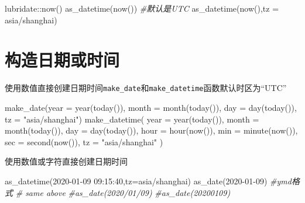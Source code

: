 \documentclass[
]{book}
\newenvironment{Shaded}{\begin{snugshade}}{\end{snugshade}}
\newcommand{\AttributeTok}[1]{\textcolor[rgb]{0.77,0.63,0.00}{#1}}
\newcommand{\CommentTok}[1]{\textcolor[rgb]{0.56,0.35,0.01}{\textit{#1}}}
\newcommand{\FunctionTok}[1]{\textcolor[rgb]{0.00,0.00,0.00}{#1}}
\newcommand{\NormalTok}[1]{#1}
\newcommand{\SpecialCharTok}[1]{\textcolor[rgb]{0.00,0.00,0.00}{#1}}
\newcommand{\StringTok}[1]{\textcolor[rgb]{0.31,0.60,0.02}{#1}}
\begin{document}
\begin{Shaded}
\begin{Highlighting}[]
\NormalTok{lubridate}\SpecialCharTok{::}\FunctionTok{now}\NormalTok{()}
\FunctionTok{as\_datetime}\NormalTok{(}\FunctionTok{now}\NormalTok{()) }\CommentTok{\#默认是UTC}
\FunctionTok{as\_datetime}\NormalTok{(}\FunctionTok{now}\NormalTok{(),}\AttributeTok{tz =} \StringTok{\textquotesingle{}asia/shanghai\textquotesingle{}}\NormalTok{)}
\end{Highlighting}
\end{Shaded}

\hypertarget{ux6784ux9020ux65e5ux671fux6216ux65f6ux95f4}{%
\section{构造日期或时间}\label{ux6784ux9020ux65e5ux671fux6216ux65f6ux95f4}}

使用数值直接创建日期时间\texttt{make\_date}和\texttt{make\_datetime}函数默认时区为``UTC''

\begin{Shaded}
\begin{Highlighting}[]
\FunctionTok{make\_date}\NormalTok{(}\AttributeTok{year =} \FunctionTok{year}\NormalTok{(}\FunctionTok{today}\NormalTok{()), }\AttributeTok{month =} \FunctionTok{month}\NormalTok{(}\FunctionTok{today}\NormalTok{()), }\AttributeTok{day =} \FunctionTok{day}\NormalTok{(}\FunctionTok{today}\NormalTok{()), }\AttributeTok{tz =} \StringTok{"asia/shanghai"}\NormalTok{)}
\FunctionTok{make\_datetime}\NormalTok{(}
  \AttributeTok{year =} \FunctionTok{year}\NormalTok{(}\FunctionTok{today}\NormalTok{()),}
  \AttributeTok{month =} \FunctionTok{month}\NormalTok{(}\FunctionTok{today}\NormalTok{()),}
  \AttributeTok{day =} \FunctionTok{day}\NormalTok{(}\FunctionTok{today}\NormalTok{()),}
  \AttributeTok{hour =} \FunctionTok{hour}\NormalTok{(}\FunctionTok{now}\NormalTok{()),}
  \AttributeTok{min =} \FunctionTok{minute}\NormalTok{(}\FunctionTok{now}\NormalTok{()),}
  \AttributeTok{sec =} \FunctionTok{second}\NormalTok{(}\FunctionTok{now}\NormalTok{()),}
  \AttributeTok{tz =} \StringTok{"asia/shanghai"}
\NormalTok{)}
\end{Highlighting}
\end{Shaded}

使用数值或字符直接创建日期时间

\begin{Shaded}
\begin{Highlighting}[]
\FunctionTok{as\_datetime}\NormalTok{(}\StringTok{\textquotesingle{}2020{-}01{-}09 09:15:40\textquotesingle{}}\NormalTok{,}\AttributeTok{tz=}\StringTok{\textquotesingle{}asia/shanghai\textquotesingle{}}\NormalTok{)}
\FunctionTok{as\_date}\NormalTok{(}\StringTok{\textquotesingle{}2020{-}01{-}09\textquotesingle{}}\NormalTok{) }\CommentTok{\#ymd格式}
\CommentTok{\# same above}
\CommentTok{\#as\_date(\textquotesingle{}2020/01/09\textquotesingle{})}
\CommentTok{\#as\_date(\textquotesingle{}20200109\textquotesingle{})}
\end{Highlighting}
\end{Shaded}
\end{document}
